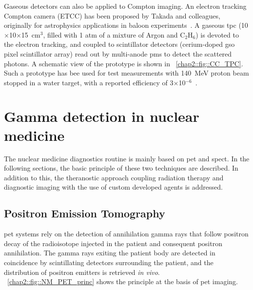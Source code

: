 Gaseous detectors can also be applied to Compton imaging. An electron tracking Compton camera (ETCC) has been proposed by Takada and colleagues, originally for astrophysics applications in baloon experiments~\parencite{Takada2011}. A gaseous \gls{tpc} (10$\times$10$\times$15~cm$^3$, filled with 1 atm of a mixture of Argon and C$_2$H$_6$) is devoted to the electron tracking, and coupled to scintillator detectors (cerium-doped \gls{gso} pixel scintillator array) read out by multi-anode \glspl{pm} to detect the scattered photons. A schematic view of the prototype is shown in \figurename~\ref{chap2::fig::CC_TPC}. Such a prototype has bee used for test measurements with 140~MeV proton beam stopped in a water target, with a reported efficiency of 3$\times$10$^{-6}$~\parencite{Kurosawa2012}. 

\section{Gamma detection in nuclear medicine}\label{chap2::sec::GammaNM}

The nuclear medicine diagnostics routine is mainly based on \gls{pet} and \gls{spect}. In the following sections, the basic principle of these two techniques are described. In addition to this, the theranostic approach coupling radiation therapy and diagnostic imaging with the use of custom developed agents is addressed. 

\subsection{Positron Emission Tomography}\label{chap2::subsec::PET_NM}

\gls{pet} systems rely on the detection of annihilation gamma rays that follow positron decay of the radioisotope injected in the patient and consequent positron annihilation. The gamma rays exiting the patient body are detected in coincidence by scintillating detectors surrounding the patient, and the distribution of positron emitters is retrieved \textit{in vivo}. 
\figurename~\ref{chap2::fig::NM_PET_princ} shows the principle at the basis of \gls{pet} imaging. 

